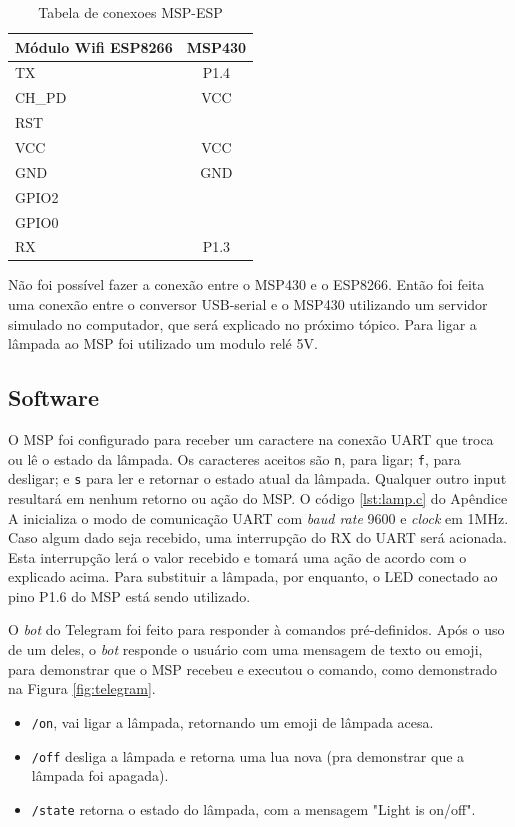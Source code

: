 \documentclass[12pt,journal,compsoc]{IEEEtran}
\begin{document}
\begin{table}[h!]
\centering
\caption{Tabela de conexoes MSP-ESP}
\label{tab:conexoes}
\begin{tabular}{|l|c|}
\hline
Módulo Wifi ESP8266 & MSP430 \\ \hline
TX & P1.4 \\ \hline
CH\_PD & VCC \\ \hline
RST &  \\ \hline
VCC & VCC \\ \hline
GND & GND \\ \hline
GPIO2 & \\ \hline
GPIO0 & \\ \hline
RX & P1.3 \\ \hline
\end{tabular}
\end{table}

Não foi possível fazer a conexão entre o MSP430 e o ESP8266. Então foi feita uma conexão entre o conversor USB-serial e o MSP430 utilizando um servidor simulado no computador, que será explicado no próximo tópico. Para ligar a lâmpada ao MSP foi utilizado um modulo relé 5V.

\subsection{Software}

O MSP foi configurado para receber um caractere na conexão UART que troca ou lê o estado da lâmpada. Os caracteres aceitos são \texttt{n}, para ligar; \texttt{f}, para desligar; e \texttt{s} para ler e retornar o estado atual da lâmpada. Qualquer outro input resultará em nenhum retorno ou ação do MSP. O código \ref{lst:lamp.c} do Apêndice A inicializa o modo de comunicação UART com \textit{baud rate} 9600 e \textit{clock} em 1MHz. Caso algum dado seja recebido, uma interrupção do RX do UART será acionada. Esta interrupção lerá o valor recebido e tomará uma ação de acordo com o explicado acima. Para substituir a lâmpada, por enquanto, o LED conectado ao pino P1.6 do MSP está sendo utilizado.


O \textit{bot} do Telegram foi feito para responder à comandos pré-definidos. Após o uso de um deles, o \textit{bot} responde o usuário com uma mensagem de texto ou emoji, para demonstrar que o MSP recebeu e executou o comando, como demonstrado na Figura \ref{fig:telegram}.

\begin{itemize}
\item \texttt{/on}, vai ligar a lâmpada, retornando um emoji de lâmpada acesa.
\item \texttt{/off} desliga a lâmpada e retorna uma lua nova (pra demonstrar que a lâmpada foi apagada).
\item \texttt{/state} retorna o estado do lâmpada, com a mensagem "Light is {on/off}".
\end{itemize}
\end{document}

